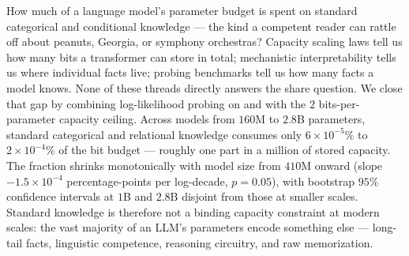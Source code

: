 How much of a language model's parameter budget is spent on standard categorical and conditional knowledge --- the kind a competent reader can rattle off about peanuts, Georgia, or symphony orchestras? Capacity scaling laws tell us how many bits a transformer can store in total; mechanistic interpretability tells us where individual facts live; probing benchmarks tell us how many facts a model knows. None of these threads directly answers the share question. We close that gap by combining log-likelihood probing on \bear and \taxi with the \citet{allenzhu2024knowledge} \(2\) bits-per-parameter capacity ceiling. Across \pythia models from \(160\)M to \(2.8\)B parameters, standard categorical and relational knowledge consumes only \(6\times 10^{-5}\%\) to \(2 \times 10^{-4}\%\) of the bit budget --- roughly one part in a million of stored capacity. The fraction shrinks monotonically with model size from \(410\)M onward (slope \(-1.5 \times 10^{-4}\) percentage-points per log-decade, \(p=0.05\)), with bootstrap \(95\%\) confidence intervals at \(1\)B and \(2.8\)B disjoint from those at smaller scales. Standard knowledge is therefore not a binding capacity constraint at modern scales: the vast majority of an LLM's parameters encode something else --- long-tail facts, linguistic competence, reasoning circuitry, and raw memorization.
